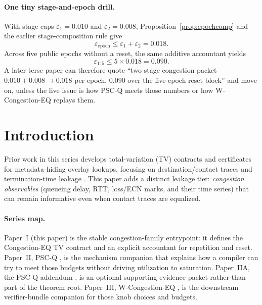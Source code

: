 \documentclass[11pt]{article}
\theoremstyle{definition}
\theoremstyle{remark}
\newcommand{\eps}{\varepsilon}
\begin{document}
\paragraph{One tiny stage-and-epoch drill.}
With stage caps $\eps_1=0.010$ and $\eps_2=0.008$, Proposition~\ref{prop:epochcomp} and the earlier stage-composition rule give
\[
\eps_{\mathrm{epoch}}\le \eps_1+\eps_2 = 0.018.
\]
Across five public epochs without a reset, the same additive accountant yields
\[
\eps_{1:5}\le 5\times 0.018 = 0.090.
\]
A later terse paper can therefore quote ``two-stage congestion packet $0.010+0.008\rightarrow 0.018$ per epoch, $0.090$ over the five-epoch reset block'' and move on, unless the live issue is how PSC-Q meets those numbers or how W-Congestion-EQ replays them.

\section{Introduction}
Prior work in this series develops total-variation (TV) contracts and certificates for metadata-hiding overlay lookups, focusing on destination/contact traces and termination-time leakage \cite{series:schedcompiler,series:knapsacktransport}.
This paper adds a distinct leakage tier: \emph{congestion observables} (queueing delay, RTT, loss/ECN marks, and their time series) that can remain informative even when contact traces are equalized.

\paragraph{Series map.}
Paper~I (this paper) is the stable congestion-family entrypoint: it defines the Congestion-EQ TV contract and an explicit accountant for repetition and reset.
Paper~II, PSC-Q \cite{series:pscq}, is the mechanism companion that explains how a compiler can try to meet those budgets without driving utilization to saturation.
Paper~IIA, the PSC-Q addendum \cite{series:pscqaddendum}, is an optional supporting-evidence packet rather than part of the theorem root.
Paper~III, W-Congestion-EQ \cite{series:wcongeq}, is the downstream verifier-bundle companion for those knob choices and budgets.
\end{document}
